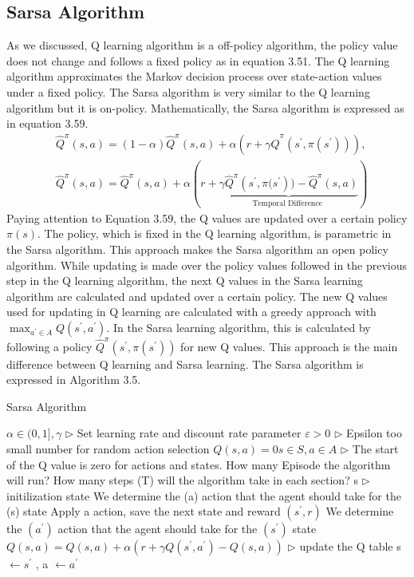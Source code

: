 \documentclass[12pt,twoside,a4]{mwbk}
\begin{document}
\subsection{Sarsa Algorithm}
As we discussed, Q learning algorithm is a  off-policy algorithm, the policy value does not change and follows a fixed policy as in equation 3.51. The Q learning algorithm approximates the Markov decision process over state-action values under a fixed policy. The Sarsa algorithm is very similar to the Q learning algorithm but it is on-policy. Mathematically, the Sarsa algorithm is expressed as in equation 3.59.
\begin{subequations}
\begin{align}
    &\widehat{Q}^{\pi}(s, a)=(1-\alpha) \hat{Q}^{\pi}(s, a)+\alpha\left(r+\gamma \hat{Q}^{\pi}\left(s^{\prime}, \pi(s^{\prime}) \right)\right), \\
&\hat{Q}^{\pi}(s, a)=\widehat{Q}^{\pi}(s, a)+\alpha(r+\underbrace{\gamma \widehat{Q}^{\pi}\left(s^{\prime}, \pi(s^{\prime}\right))-\widehat{Q}^{\pi}(s, a)}_{\text {Temporal Difference }})
\end{align}
\end{subequations}
Paying attention to Equation 3.59, the Q values are updated over a certain policy $\pi (s)$. The policy, which is fixed in the Q learning algorithm, is parametric in the Sarsa algorithm. This approach makes the Sarsa algorithm an open policy algorithm. While updating is made over the policy values followed in the previous step in the Q learning algorithm, the next Q values in the Sarsa learning algorithm are calculated and updated over a certain policy. The new Q values used for updating in Q learning are calculated with a greedy approach with $\max_{a^\prime \in A} Q(s^\prime, a^\prime)$. In the Sarsa learning algorithm, this is calculated by following a policy $\hat{Q}^{\pi }(s^\prime,\pi(s^\prime))$ for new Q values. This approach is the main difference between Q learning and Sarsa learning. The Sarsa algorithm is expressed in Algorithm 3.5.
\begin{algorithm}
\caption{Sarsa Algorithm}
\begin{algorithmic}[1]
\State $\alpha \in (0,1], \gamma$ $\triangleright$ Set learning rate and discount rate parameter
\State $\varepsilon > 0$ $\triangleright$ Epsilon too small number for random action selection
\State $Q(s,a) = 0s \in S, a \in A$ $\triangleright$ The start of the Q value is zero for actions and states.
\State How many Episode the algorithm will run?
\State How many steps (T) will the algorithm take in each section?
    \State s $\triangleright$ initilization state
    \State We determine the (a) action that the agent should take for the (s) state
        \State Apply a action, save the next state and reward $(s^{\prime}, r)$ 
        \State We determine the $(a^\prime)$ action that the agent should take for the $(s^\prime)$ state
        \State $Q(s, a)=Q(s, a)+\alpha(r+\gamma Q\left(s^{\prime}, a^{\prime}\right)-Q(s, a))$ $\triangleright$ update the Q table
        \State s $\leftarrow s^{\prime}$ , a $\leftarrow a^{\prime}$
    \EndFor
\EndFor
\end{algorithmic}
\end{algorithm}
\end{document}
